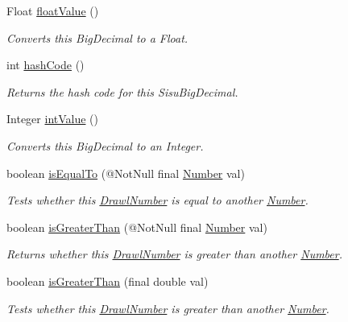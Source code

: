 \begin{DoxyCompactItemize}
Float \hyperlink{classcom_1_1aarrelaakso_1_1drawl_1_1_drawl_number_ae8442cbd5cc7ab0c35c0302b196b3819}{float\+Value} ()
\begin{DoxyCompactList}\small\item\em Converts this Big\+Decimal to a Float. \end{DoxyCompactList}\item 
int \hyperlink{classcom_1_1aarrelaakso_1_1drawl_1_1_drawl_number_a0048361007923e4b902a4581eb9ba45c}{hash\+Code} ()
\begin{DoxyCompactList}\small\item\em Returns the hash code for this Sisu\+Big\+Decimal. \end{DoxyCompactList}\item 
Integer \hyperlink{classcom_1_1aarrelaakso_1_1drawl_1_1_drawl_number_a8022d04415c5449344ac1e23658f8802}{int\+Value} ()
\begin{DoxyCompactList}\small\item\em Converts this Big\+Decimal to an Integer. \end{DoxyCompactList}\item 
boolean \hyperlink{classcom_1_1aarrelaakso_1_1drawl_1_1_drawl_number_af9c62a136858a5eae279039658a2cfdc}{is\+Equal\+To} (@Not\+Null final \hyperlink{interfacecom_1_1aarrelaakso_1_1drawl_1_1_number}{Number} val)
\begin{DoxyCompactList}\small\item\em Tests whether this \hyperlink{classcom_1_1aarrelaakso_1_1drawl_1_1_drawl_number}{Drawl\+Number} is equal to another \hyperlink{interfacecom_1_1aarrelaakso_1_1drawl_1_1_number}{Number}. \end{DoxyCompactList}\item 
boolean \hyperlink{classcom_1_1aarrelaakso_1_1drawl_1_1_drawl_number_a17616696cef2e7b72d2614481182293a}{is\+Greater\+Than} (@Not\+Null final \hyperlink{interfacecom_1_1aarrelaakso_1_1drawl_1_1_number}{Number} val)
\begin{DoxyCompactList}\small\item\em Returns whether this \hyperlink{classcom_1_1aarrelaakso_1_1drawl_1_1_drawl_number}{Drawl\+Number} is greater than another \hyperlink{interfacecom_1_1aarrelaakso_1_1drawl_1_1_number}{Number}. \end{DoxyCompactList}\item 
boolean \hyperlink{classcom_1_1aarrelaakso_1_1drawl_1_1_drawl_number_ae60f5bdfeec3c50dec35e5310f163fa4}{is\+Greater\+Than} (final double val)
\begin{DoxyCompactList}\small\item\em Tests whether this \hyperlink{classcom_1_1aarrelaakso_1_1drawl_1_1_drawl_number}{Drawl\+Number} is greater than another \hyperlink{interfacecom_1_1aarrelaakso_1_1drawl_1_1_number}{Number}. \end{DoxyCompactList}\item 

\end{DoxyCompactItemize}
